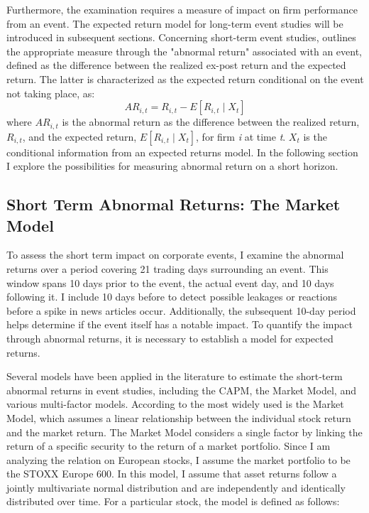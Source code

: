 Furthermore, the examination requires a measure of impact on firm performance from an event. The expected return model for long-term event studies will be introduced in subsequent sections. Concerning short-term event studies, \cite{Event_studies} outlines the appropriate measure through the "abnormal return" associated with an event, defined as the difference between the realized ex-post return and the expected return. The latter is characterized as the expected return conditional on the event not taking place, as:  
\begin{equation}
    AR_{i,t} = R_{i,t} - E[R_{i,t} \mid X_t ]
    \label{eq:AR1}
\end{equation}
where $AR_{i,t}$ is the abnormal return as the difference between the realized return, $R_{i,t}$, and the expected return, $E[R_{i,t} \mid X_t ]$, for firm \textit{i} at time \textit{t}. $X_t$ is the conditional information from an expected returns model. In the following section I explore the possibilities for measuring abnormal return on a short horizon. 

\subsection{Short Term Abnormal Returns: The Market Model} \label{market_model}

To assess the short term impact on corporate events, I examine the abnormal returns over a period covering 21 trading days surrounding an event. This window spans 10 days prior to the event, the actual event day, and 10 days following it. I include 10 days before to detect possible leakages or reactions before a spike in news articles occur. Additionally, the subsequent 10-day period helps determine if the event itself has a notable impact. To quantify the impact through abnormal returns, it is necessary to establish a model for expected returns. 

Several models have been applied in the literature to estimate the short-term abnormal returns in event studies, including the CAPM, the Market Model, and various multi-factor models. According to \cite{holler2014event} the most widely used is the Market Model, which assumes a linear relationship between the individual stock return and the market return.  The Market Model considers a single factor by linking the return of a specific security to the return of a market portfolio. Since I am analyzing the relation on European stocks, I assume the market portfolio to be the STOXX Europe 600. In this model, I assume that asset returns follow a jointly multivariate normal distribution and are independently and identically distributed over time. For a particular stock, the model is defined as follows:


